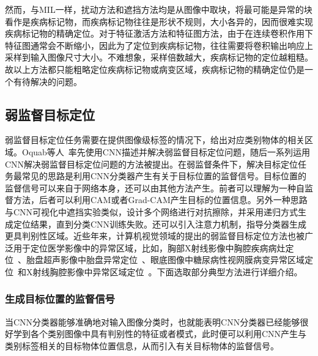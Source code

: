 然而，与MIL一样，扰动方法和遮挡方法均是从图像中取块，将最可能是异常的块看作是疾病标记物，而疾病标记物往往是形状不规则，大小各异的，因而很难实现疾病标记物的精确定位。对于特征激活方法和特征图方法，由于在连续卷积作用下特征图通常会不断缩小，因此为了定位到疾病标记物，往往需要将卷积输出响应上采样到输入图像尺寸大小。不难想象，采样倍数越大，疾病标记物的定位越粗糙。故以上方法都只能粗略定位疾病标记物或病变区域，疾病标记物的精确定位仍是一个有待解决的问题。

\subsection{弱监督目标定位}
弱监督目标定位任务需要在提供图像级标签的情况下，给出对应类别物体的相关区域。Oquab等人~\cite{Oquab2015IsOL}率先使用CNN描述并解决弱监督目标定位问题，随后一系列运用CNN解决弱监督目标定位问题的方法被提出。在弱监督条件下，解决目标定位任务最常见的思路是利用CNN分类器产生有关于目标位置的监督信号。目标位置的监督信号可以来自于网络本身，还可以由其他方法产生。前者可以理解为一种自监督方法，后者可以利用CAM或者Grad-CAM产生目标的位置信息。另外一种思路与CNN可视化中遮挡实验类似，设计多个网络进行对抗擦除，并采用递归方式生成定位结果，直到分类CNN训练失败。还可以引入注意力机制，指导分类器生成更具判别性区域。近些年来，计算机视觉领域的提出的弱监督目标定位方法也被广泛用于定位医学影像中的异常区域，比如，胸部X射线影像中胸腔疾病病灶定位~\cite{WangPLLBS17}、胎盘超声影像中胎盘异常定位~\cite{Qi2017WeaklySL}、眼底图像中糖尿病性视网膜病变异常区域定位~\cite{GonzlezGonzalo2018ImprovingWL}和X射线胸腔影像中异常区域定位~\cite{Yao2018WeaklySM}。下面选取部分典型方法进行详细介绍。

\subsubsection{生成目标位置的监督信号}
当CNN分类器能够准确地对输入图像分类时，也就能表明CNN分类器已经能够很好学到各个类别图像中具有判别性的特征或者模式，此时便可以利用CNN产生与类别标签相关的目标物体位置信息，从而引入有关目标物体的监督信号。

